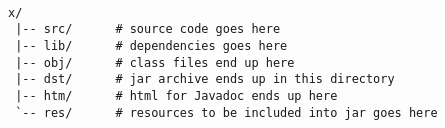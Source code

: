 {\small
\begin{verbatim}

x/
 |-- src/      # source code goes here
 |-- lib/      # dependencies goes here
 |-- obj/      # class files end up here
 |-- dst/      # jar archive ends up in this directory
 |-- htm/      # html for Javadoc ends up here
 `-- res/      # resources to be included into jar goes here

\end{verbatim}
}

